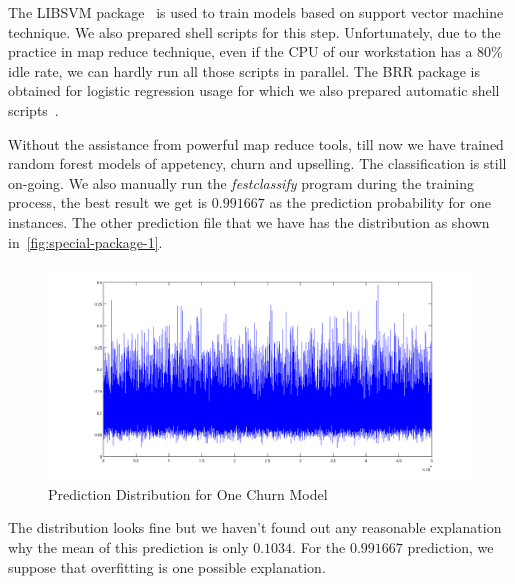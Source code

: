 \documentclass[journal]{IEEEtran}
\begin{document}
The LIBSVM package~\cite{Chang:2011:LLS:1961189.1961199} is used to
train models based on support vector machine technique. We also
prepared shell scripts for this step. Unfortunately, due to the
practice in map reduce technique, even if the CPU of our workstation
has a 80\% idle rate, we can hardly run all those scripts in
parallel. The BRR package is obtained for logistic regression usage
for which we also prepared automatic shell
scripts~\cite{Genkin:August2007:0040-1706:291}.   
\par
Without the assistance from powerful map reduce tools, till now we
have trained random forest models of appetency, churn and
upselling. The classification is still on-going. We also manually run
the \emph{festclassify} program during the training process, the best
result we get is $0.991667$ as the prediction probability for one
instances. The other prediction file that we have has the distribution
as shown in~\autoref{fig:special-package-1}.
\begin{figure}[!t]
  \centering
  \includegraphics[scale=0.2]{train-plot}
  \caption{Prediction Distribution for One Churn Model}
  \label{fig:special-package-1}
\end{figure}
The distribution looks fine but we haven't found out any reasonable
explanation why the mean of this prediction is only $0.1034$. For the
$0.991667$ prediction, we suppose that overfitting is one possible
explanation. 
\end{document}
